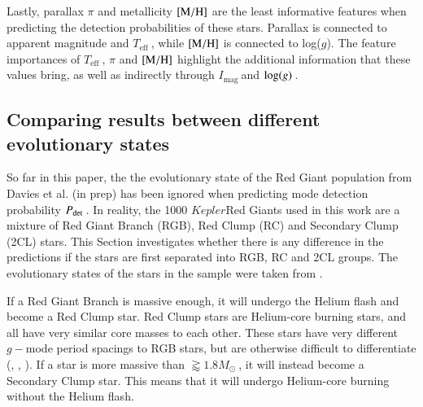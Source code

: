 \documentclass[a4paper,fleqn,usenatbib,useAMS]{mnras}
\newcommand{\teff}{\ensuremath{T_{\textrm{eff}}\:}}
\newcommand{\kep}{\ensuremath{Kepler}\:}
\newcommand{\pdet}{\ensuremath{P_{\rm det}\:}}
\newcommand{\imag}{\ensuremath{I_{\textrm{mag}}\:}}
\newcommand{\msol}{\ensuremath{M_{\odot}\:}}
\newcommand{\logg}{\ensuremath{{\rm log}(g)\:}}
\begin{document}
Lastly, parallax $\pi$ and metallicity $\rm [M/H]$ are the least informative features when predicting the detection probabilities of these stars. Parallax is connected to apparent magnitude and \teff, while $\rm [M/H]$ is connected to log($g$). The feature importances of \teff, $\pi$ and $\rm [M/H]$ highlight the additional information that these values bring, as well as indirectly through \imag and \logg.

\subsection{Comparing results between different evolutionary states}
\label{sect: evo states}

So far in this paper, the the evolutionary state of the Red Giant population from Davies et al. (in prep) has been ignored when predicting mode detection probability \pdet. In reality, the 1000 \kep Red Giants used in this work are a mixture of Red Giant Branch (RGB), Red Clump (RC) and Secondary Clump (2CL) stars. This Section investigates whether there is any difference in the predictions if the stars are first separated into RGB, RC and 2CL groups. The evolutionary states of the stars in the sample were taken from \citet{elsworth_new_2017}. 

If a Red Giant Branch is massive enough, it will undergo the Helium flash and become a Red Clump star. Red Clump stars are Helium-core burning stars, and all have very similar core masses to each other. These stars have very different $g-$mode period spacings to RGB stars, but are otherwise difficult to differentiate (\citet{chaplin_asteroseismology_2013}, \citet{bedding_solar-like_2011}, \citet{beck_kepler_2011}). If a star is more massive than $\gtrapprox1.8\msol$, it will instead become a Secondary Clump star. This means that it will undergo Helium-core burning without the Helium flash.
\end{document}
